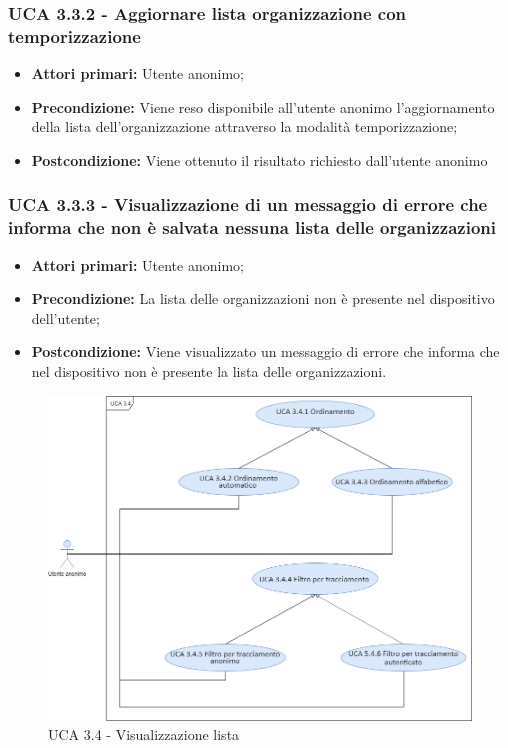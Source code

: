 \subsubsection{UCA 3.3.2 - Aggiornare lista organizzazione con temporizzazione}%
\begin{itemize} 
	\item \textbf{Attori primari:} Utente anonimo;
	\item \textbf{Precondizione:} Viene reso disponibile all’utente anonimo l’aggiornamento della lista dell’organizzazione attraverso la modalità temporizzazione; 	
	\item \textbf{Postcondizione:} Viene ottenuto il risultato richiesto dall’utente anonimo
\end{itemize}

\subsubsection{UCA 3.3.3 - Visualizzazione di un messaggio di errore che informa che non è salvata nessuna lista delle organizzazioni}%
\begin{itemize}
	\item \textbf{Attori primari:} Utente anonimo;
	\item \textbf{Precondizione:} La lista delle organizzazioni non è presente nel dispositivo dell’utente;
	\item \textbf{Postcondizione:} Viene visualizzato un messaggio di errore che informa che nel dispositivo non è presente la lista delle organizzazioni.
\end{itemize}

\newpage
\begin{figure}[h]
	\centering
	\caption{UCA 3.4 - Visualizzazione lista}
	\includegraphics[scale=0.5]{sezioni/UseCase/Immagini/UCA3.4.png}
\end{figure}


